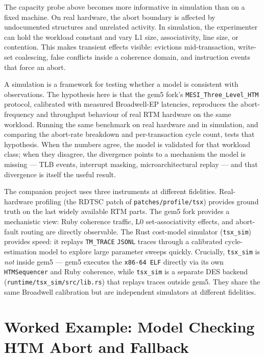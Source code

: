 The capacity probe above becomes more informative in simulation than on a fixed machine. On real hardware, the abort boundary is affected by undocumented structures and unrelated activity. In simulation, the experimenter can hold the workload constant and vary L1 size, associativity, line size, or contention. This makes transient effects visible: evictions mid-transaction, write-set coalescing, false conflicts inside a coherence domain, and instruction events that force an abort.

A simulation is a framework for testing whether a model is consistent with observations. The hypothesis here is that the gem5 fork's \texttt{MESI\_Three\_Level\_HTM} protocol, calibrated with measured Broadwell-EP latencies, reproduces the abort-frequency and throughput behaviour of real RTM hardware on the same workload. Running the same benchmark on real hardware and in simulation, and comparing the abort-rate breakdown and per-transaction cycle count, tests that hypothesis. When the numbers agree, the model is validated for that workload class; when they disagree, the divergence points to a mechanism the model is missing --- TLB events, interrupt masking, microarchitectural replay --- and that divergence is itself the useful result.

The companion project uses three instruments at different fidelities. Real-hardware profiling (the RDTSC patch of \texttt{patches/profile/tsx}) provides ground truth on the last widely available RTM parts. The gem5 fork provides a mechanistic view: Ruby coherence traffic, L0 set-associativity effects, and abort-fault routing are directly observable. The Rust cost-model simulator (\texttt{tsx\_sim}) provides speed: it replays \texttt{TM\_TRACE} \texttt{JSONL} traces through a calibrated cycle-estimation model to explore large parameter sweeps quickly. Crucially, \texttt{tsx\_sim} is \emph{not} inside gem5 --- gem5 executes the \texttt{x86-64 ELF} directly via its own \texttt{HTMSequencer} and Ruby coherence, while \texttt{tsx\_sim} is a separate DES backend (\texttt{runtime/tsx\_sim/src/lib.rs}) that replays traces outside gem5. They share the same Broadwell calibration but are independent simulators at different fidelities.

\section{Worked Example: Model Checking HTM Abort and Fallback}
\label{sec:htm-fallback-tla}

